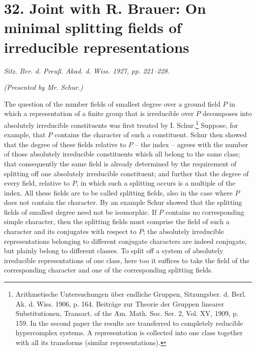 \documentclass[11pt]{article}
\newcommand{\mat}[1]{\begin{pmatrix}#1\end{pmatrix}}
\begin{document}
\providecommand{\mat}[1]{\begin{pmatrix}#1\end{pmatrix}}


\setcounter{footnote}{0}

\section*{32. Joint with R. Brauer: On minimal splitting fields of irreducible representations}
\emph{Sitz. Ber. d. Preuß. Akad. d. Wiss. 1927, pp. 221--228.}

\begin{center}\emph{(Presented by Mr. Schur.)}\end{center}

The question of the number fields of smallest degree over a ground field $P$ in which a representation of a finite group that is irreducible over $P$ decomposes into absolutely irreducible constituents was first treated by I. Schur.\footnote{Arithmetische Untersuchungen über endliche Gruppen, Sitzungsber. d. Berl. Ak. d. Wiss. 1906, p. 164. Beiträge zur Theorie der Gruppen linearer Substitutionen, Transact. of the Am. Math. Soc. Ser. 2, Vol. XV, 1909, p. 159. In the second paper the results are transferred to completely reducible hypercomplex systems. A representation is collected into one class together with all its transforms (similar representations).} Suppose, for example, that $P$ contains the character of such a constituent. Schur then showed that the degree of these fields relative to $P$ -- the index -- agrees with the number of those absolutely irreducible constituents which all belong to the same class; that consequently the same field is already determined by the requirement of splitting off one absolutely irreducible constituent; and further that the degree of every field, relative to $P$, in which such a splitting occurs is a multiple of the index. All these fields are to be called splitting fields, also in the case where $P$ does not contain the character. By an example Schur showed that the splitting fields of smallest degree need not be isomorphic. If $P$ contains no corresponding simple character, then the splitting fields must comprise the field of such a character and its conjugates with respect to $P$; the absolutely irreducible representations belonging to different conjugate characters are indeed conjugate, but plainly belong to different classes. To split off a system of absolutely irreducible representations of one class, here too it suffices to take the field of the corresponding character and one of the corresponding splitting fields.
\end{document}
